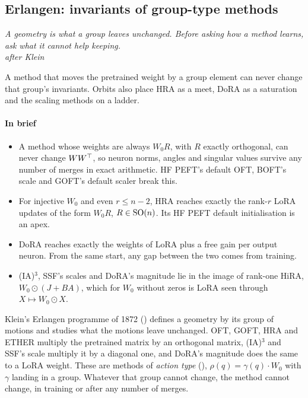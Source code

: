 \subsection{Erlangen: invariants of group-type methods}\label{sec:erlangen}

\begin{flushright}
\small\itshape A geometry is what a group leaves unchanged. Before asking how a method learns,\\
ask what it cannot help keeping.\\[2pt]
{\upshape\footnotesize after Klein}
\end{flushright}

A method that moves the pretrained weight by a group element can never change that group's invariants. Orbits also
place HRA as a meet, DoRA as a saturation and the scaling methods on a ladder.

\paragraph{In brief}
\begin{itemize}
  \item A method whose weights are always $W_0R$, with $R$ exactly orthogonal, can never change $WW^{\top}$, so neuron norms,
    angles and singular values survive any number of merges in exact arithmetic. HF PEFT's default OFT, BOFT's scale and
    GOFT's default scaler break this.
  \item For injective $W_0$ and even $r\le n-2$, HRA reaches exactly the rank-$r$ LoRA updates of the form $W_0R$,
    $R\in\mathrm{SO}(n)$. Its HF PEFT default initialisation is an apex.
  \item DoRA reaches exactly the weights of LoRA plus a free gain per output neuron. From the same start, any gap between
    the two comes from training.
  \item (IA)$^3$, SSF's scales and DoRA's magnitude lie in the image of rank-one HiRA, $W_0\odot(J+BA)$, which for $W_0$
    without zeros is LoRA seen through $X\mapsto W_0\odot X$.
\end{itemize}

Klein's Erlangen programme of 1872 \citep{xklein1872vergleichende} () defines a geometry by its group of
motions and studies what the motions leave unchanged. OFT, GOFT, HRA and ETHER multiply the pretrained matrix by an
orthogonal matrix, (IA)$^3$ and SSF's scale multiply it by a diagonal one, and DoRA's magnitude does the same to a LoRA
weight. These are methods of \emph{action type} (), $\rho(q)=\gamma(q)\cdot W_0$ with $\gamma$
landing in a group. Whatever that group cannot change, the method cannot change, in training or after any number of
merges.

